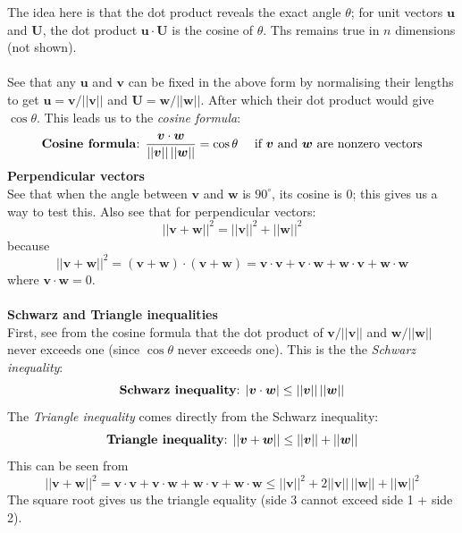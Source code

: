 \documentclass{report}
\begin{document}
The idea here is that the dot product reveals the exact angle $\theta$; for unit vectors $\bm u$ and $\bm U$, the dot product $\bm u\cdot\bm U$ is the cosine of 
$\theta$. Ths remains true in $n$ dimensions (not shown).\\
\vspace{1mm}\\
See that any $\bm{u}$ and $\bm{v}$ can be fixed in the above form by normalising their lengths to get
$\bm u=\bm v/||\bm v||$ and $\bm U=\bm w/||\bm w||$. After which their dot product would give $\cos\theta$. This leads us to the \textit{cosine formula}:
\begin{equation*}
\text{\textbf{Cosine formula}: }
\frac{\bm v\cdot\bm w}{||\bm v||\,||\bm w||}=\cos\theta\quad\text{ if $\bm v$ and $\bm w$ are nonzero vectors}
\end{equation*}
\textbf{Perpendicular vectors}\\
See that when the angle between $\bm v$ and $\bm w$ is $90^\circ$, its cosine is 0; this gives us a way to test this. Also see that for perpendicular vectors:
\begin{equation*}
||\bm v+\bm w||^2=||\bm v||^2+||\bm w||^2
\end{equation*}
because
\begin{equation*}
||\bm v+\bm w||^2=(\bm v+\bm w)\cdot(\bm v+\bm w)=\bm v\cdot\bm v+\bm v\cdot\bm w+\bm w\cdot\bm v+\bm w\cdot\bm w
\end{equation*}
where $\bm v\cdot \bm w=0$.\\
\vspace{1mm}\\
\textbf{Schwarz and Triangle inequalities}\\
First, see from the cosine formula that the dot product of $\bm v/||\bm v||$ and
$\bm w/||\bm w||$ never exceeds one (since $\cos\theta$ never exceeds one). This is the the 
\textit{Schwarz inequality}:
\begin{equation*}
\text{\textbf{Schwarz inequality}: }|\bm v\cdot\bm w|\leq||\bm v||\,||\bm w||
\end{equation*}
The \textit{Triangle inequality} comes directly from the Schwarz inequality:
\begin{equation*}
\text{\textbf{Triangle inequality}: }||\bm v+\bm w||\leq||\bm v||+||\bm w||
\end{equation*}
This can be seen from
\begin{equation*}
||\bm v+\bm w||^2=\bm v\cdot\bm v+\bm v\cdot\bm w+\bm w\cdot\bm v+\bm w\cdot\bm w
\leq||\bm v||^2+2||\bm v||\,||\bm w||+||\bm w||^2
\end{equation*}
The square root gives us the triangle equality (side 3 cannot exceed side 1 + side 2).
\newpage
\end{document}
